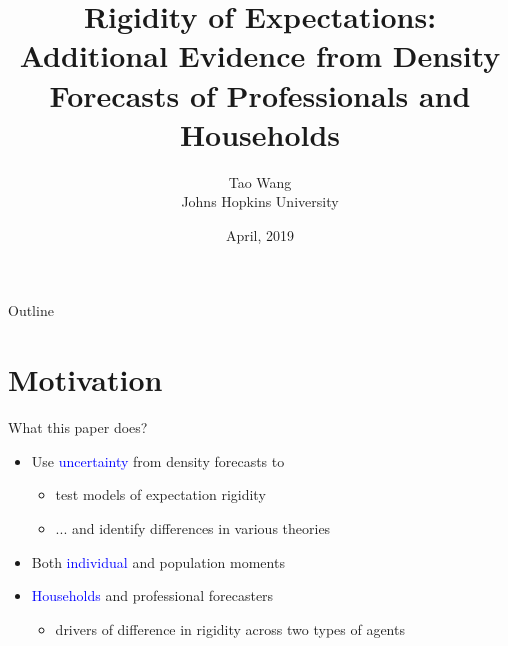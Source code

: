 \documentclass{beamer}
\title{Rigidity of Expectations: Additional Evidence from Density Forecasts of Professionals and Households}
\author{Tao Wang \\ Johns Hopkins University}
\date{April, 2019}
\begin{document}
	
	
\begin{frame}
	\titlepage
\end{frame}
\begin{frame}{Outline}
	\tableofcontents
\end{frame}

\section{Motivation}



\begin{frame}{What this paper does?}
\begin{itemize}
	\item Use \textcolor{blue}{uncertainty} from density forecasts to 
	\begin{itemize}
		\item test models of expectation rigidity 
		\item ... and identify differences in various theories 
	\end{itemize}
	\item Both \textcolor{blue}{individual} and population moments 
	\item \textcolor{blue}{Households} and professional forecasters 
	\begin{itemize}
		\item drivers of difference in rigidity across two types of agents
	\end{itemize}
\end{itemize}
\end{frame}
\end{document}
